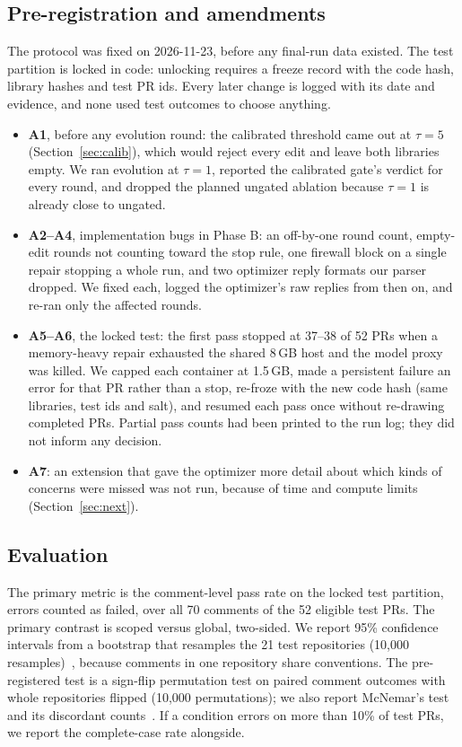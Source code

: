 \documentclass[sigconf, authorversion, nonacm]{acmart}
\begin{document}
\subsection{Pre-registration and amendments}
The protocol was fixed on 2026-11-23, before any final-run data existed. The test partition is locked in code: unlocking requires a freeze record with the code hash, library hashes and test PR ids. Every later change is logged with its date and evidence, and none used test outcomes to choose anything.
\begin{itemize}
\item \textbf{A1}, before any evolution round: the calibrated threshold came out at $\tau=5$ (Section~\ref{sec:calib}), which would reject every edit and leave both libraries empty. We ran evolution at $\tau=1$, reported the calibrated gate's verdict for every round, and dropped the planned ungated ablation because $\tau=1$ is already close to ungated.
\item \textbf{A2--A4}, implementation bugs in Phase B: an off-by-one round count, empty-edit rounds not counting toward the stop rule, one firewall block on a single repair stopping a whole run, and two optimizer reply formats our parser dropped. We fixed each, logged the optimizer's raw replies from then on, and re-ran only the affected rounds.
\item \textbf{A5--A6}, the locked test: the first pass stopped at 37--38 of 52 PRs when a memory-heavy repair exhausted the shared 8\,GB host and the model proxy was killed. We capped each container at 1.5\,GB, made a persistent failure an error for that PR rather than a stop, re-froze with the new code hash (same libraries, test ids and salt), and resumed each pass once without re-drawing completed PRs. Partial pass counts had been printed to the run log; they did not inform any decision.
\item \textbf{A7}: an extension that gave the optimizer more detail about which kinds of concerns were missed was not run, because of time and compute limits (Section~\ref{sec:next}).
\end{itemize}

\subsection{Evaluation}
The primary metric is the comment-level pass rate on the locked test partition, errors counted as failed, over all 70 comments of the 52 eligible test PRs. The primary contrast is scoped versus global, two-sided. We report 95\% confidence intervals from a bootstrap that resamples the 21 test repositories (10,000 resamples)~\cite{efron1993bootstrap, field2007clustered}, because comments in one repository share conventions. The pre-registered test is a sign-flip permutation test on paired comment outcomes with whole repositories flipped (10,000 permutations); we also report McNemar's test~\cite{mcnemar1947} and its discordant counts~\cite{dror2018hitchhiker}. If a condition errors on more than 10\% of test PRs, we report the complete-case rate alongside.
\end{document}
